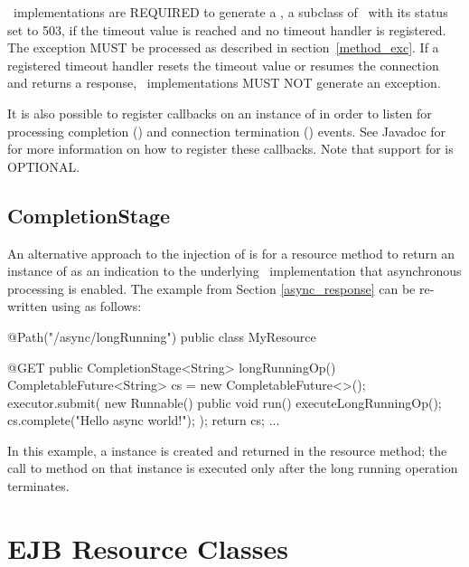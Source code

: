 \jaxrs\ implementations are REQUIRED to generate a , a subclass of \WebApplicationException\ with its status set to 503, if the timeout value is reached and no timeout handler is registered. The exception MUST be processed as described in section~\ref{method_exc}. If a registered timeout handler resets the timeout value or resumes the connection and returns a response, \jaxrs\ implementations MUST NOT generate an exception.

It is also possible to register callbacks on an instance of  in order to listen for processing completion () and connection termination () events. See Javadoc for  for more information on how to register these callbacks. Note that support for  is OPTIONAL.

\subsection{CompletionStage}
\label{completionstage}

An alternative approach to the injection of  is for a resource method to return an instance of  as an indication to the underlying \jaxrs\ implementation that asynchronous processing is enabled. The example from Section \ref{async_response} can be re-written using  as follows:

\begin{listing}{1}
	@Path("/async/longRunning")
	public class MyResource {
		
		@GET
		public CompletionStage<String> longRunningOp() {
			CompletableFuture<String> cs = new CompletableFuture<>();
			executor.submit(
			    new Runnable() {
				    public void run() {
					    executeLongRunningOp();
					    cs.complete("Hello async world!");
		  	        } 
	  	        });
	  	    return cs;
		} 
		...
	}
\end{listing}

In this example, a  instance is created and returned in the resource method; the call to method  on that instance is executed only after the long running operation terminates.

\section{EJB Resource Classes}
\label{async_ejbs}

